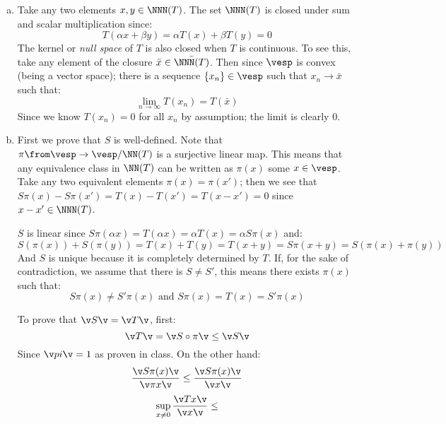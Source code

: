 \begin{enumerate}[(a)]
    \item Take any two elements $x,y\in\NNN(T)$. The set $\NNN(T)$ is closed under sum and scalar multiplication since:
        $$T(\alpha x +\beta y ) = \alpha T(x) + \beta T(y) = 0$$
        The kernel or \emph{null space} of $T$ is also closed when $T$ is continuous. 
        To see this, take any element of the closure $\bar x \in \bar{\NNN(T)}$.
        Then since $\vesp$ is convex (being a vector space); there is a sequence $\{x_n\}\in \vesp$ such that $x_n\to \bar x$ such that:
        $$\lim_{n\to \infty} T(x_n) = T(\bar x)$$
        Since we know $T(x_n)=0$ for all $x_n$ by assumption; the limit is clearly 0.
    \item First we prove that $S$ is well-defined. 
        Note that $\pi\from \vesp \to \vesp/\NN(T)$ is a surjective linear map. 
        This means that any  equivalence class in $\NN(T)$ can be written as $\pi(x)$ some $x\in \vesp$.
        Take any two equivalent elements $\pi(x) =\pi(x')$; then we see that $S\pi(x) - S\pi(x') = T(x)-T(x')=T(x-x')=0$ since $x-x'\in \NNN(T)$.

        $S$ is linear since $S\pi(\alpha x) = T(\alpha x)= \alpha T(x) = \alpha S\pi(x)$ and:
        $$S(\pi(x)) + S(\pi(y))= T(x) + T(y) = T(x+y) = S\pi(x+y) = S(\pi(x) + \pi(y))$$
        And $S$ is unique because it is completely determined by $T$. 
        If, for the sake of contradiction, we assume that there is $S\neq S'$, this means there exists $\pi(x)$ such that:
        $$S\pi(x) \neq S'\pi(x) \text{ and } S\pi(x) = T(x) = S'\pi(x)$$

        To prove that $\v S \v = \v T\v$, first:
        $$\v T \v = \v S\circ \pi\v \leq \v S \v $$
        Since $\v pi \v= 1$ as proven in class. On the other hand:
        $$\frac{\v S\pi (x)\v}{\v \pi x\v}\leq \frac{\v S\pi (x)\v}{\v  x\v}$$
        $$\sup_{ x \neq 0}\frac{\v Tx\v}{\v x\v}\leq $$
\end{enumerate}
